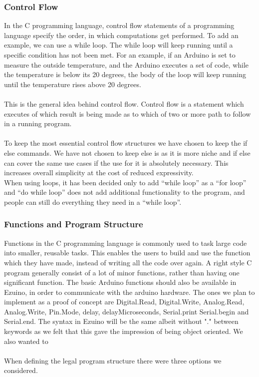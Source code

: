 \subsubsection*{Control Flow}
In the C programming language, control flow statements of a programming language specify the order, in which computations get performed. To add an example, we can use a while loop. The while loop will keep running until a specific condition has not been met. For an example, if an Arduino is set to measure the outside temperature, and the Arduino executes a set of code, while the temperature is below its 20 degrees, the body of the loop will keep running until the temperature rises above 20 degrees.  \\
\\
This is the general idea behind control flow. Control flow is a statement which executes of which result is being made as to which of two or more path to follow in a running program. \\
\\
To keep the most essential control flow structures we have chosen to keep the if else commands. We have not chosen to keep else is as it is more niche and if else can cover the same use cases if the use for it is absolutely necessary. This increases overall simplicity at the cost of reduced expressivity. 
\\
When using loops, it has been decided only to add  “while loop” as a “for loop” and “do while loop” does not add additional functionality to the program, and people can still do everything they need in a “while loop”.
\subsubsection*{Functions and Program Structure}
Functions in the C programming language is commonly used to task large code into smaller, reusable tasks. This enables the users to build and use the function which they have made, instead of writing all the code over again. A right style C program generally consist of a lot of minor functions, rather than having one significant function. 
The basic Arduino functions should also be available in Ezuino, in order to communicate with the arduino hardware. The ones we plan to implement as a proof of concept are Digital.Read, Digital.Write, Analog.Read, Analog.Write, Pin.Mode, delay, delayMicroseconds, Serial.print Serial.begin and Serial.end. The syntax in Ezuino will be the same albeit without "." between keywords as we felt that this gave the impression of being object oriented.
We also wanted to 
\\ \\
When defining the legal program structure there were three options we considered. \\ \\
